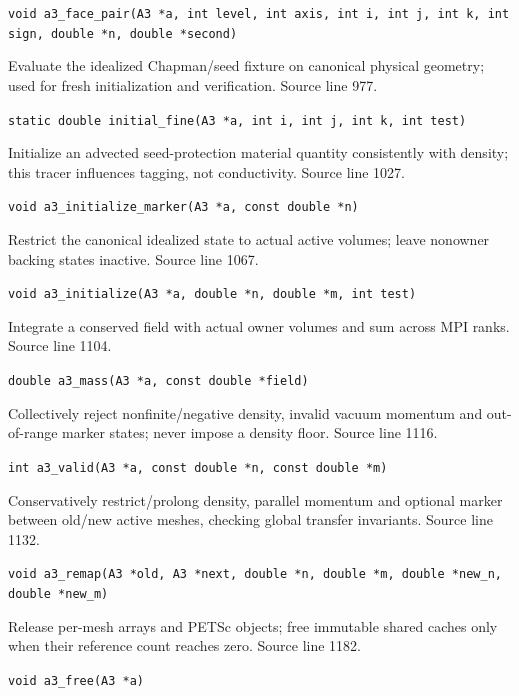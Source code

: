 \begin{description}[style=nextline,leftmargin=0pt,labelindent=0pt,labelwidth=0pt,labelsep=0pt]
{\small\nolinkurl{void a3_face_pair(A3 *a, int level, int axis, int i, int j, int k, int sign, double *n, double *second)}}
\item[\texttt{initial\_fine}] Evaluate the idealized Chapman/seed fixture on canonical physical geometry; used for fresh initialization and verification. Source line 977.\par
{\small\nolinkurl{static double initial_fine(A3 *a, int i, int j, int k, int test)}}
\item[\texttt{a3\_initialize\_marker}] Initialize an advected seed-protection material quantity consistently with density; this tracer influences tagging, not conductivity. Source line 1027.\par
{\small\nolinkurl{void a3_initialize_marker(A3 *a, const double *n)}}
\item[\texttt{a3\_initialize}] Restrict the canonical idealized state to actual active volumes; leave nonowner backing states inactive. Source line 1067.\par
{\small\nolinkurl{void a3_initialize(A3 *a, double *n, double *m, int test)}}
\item[\texttt{a3\_mass}] Integrate a conserved field with actual owner volumes and sum across MPI ranks. Source line 1104.\par
{\small\nolinkurl{double a3_mass(A3 *a, const double *field)}}
\item[\texttt{a3\_valid}] Collectively reject nonfinite/negative density, invalid vacuum momentum and out-of-range marker states; never impose a density floor. Source line 1116.\par
{\small\nolinkurl{int a3_valid(A3 *a, const double *n, const double *m)}}
\item[\texttt{a3\_remap}] Conservatively restrict/prolong density, parallel momentum and optional marker between old/new active meshes, checking global transfer invariants. Source line 1132.\par
{\small\nolinkurl{void a3_remap(A3 *old, A3 *next, double *n, double *m, double *new_n, double *new_m)}}
\item[\texttt{a3\_free}] Release per-mesh arrays and PETSc objects; free immutable shared caches only when their reference count reaches zero. Source line 1182.\par
{\small\nolinkurl{void a3_free(A3 *a)}}
\end{description}
